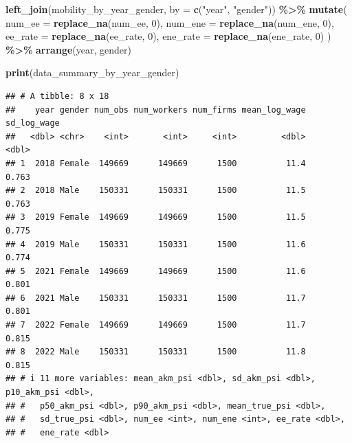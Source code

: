\documentclass[
]{article}
\newenvironment{Shaded}{\begin{snugshade}}{\end{snugshade}}
\newcommand{\AttributeTok}[1]{\textcolor[rgb]{0.13,0.29,0.53}{#1}}
\newcommand{\DecValTok}[1]{\textcolor[rgb]{0.00,0.00,0.81}{#1}}
\newcommand{\FunctionTok}[1]{\textcolor[rgb]{0.13,0.29,0.53}{\textbf{#1}}}
\newcommand{\NormalTok}[1]{#1}
\newcommand{\SpecialCharTok}[1]{\textcolor[rgb]{0.81,0.36,0.00}{\textbf{#1}}}
\newcommand{\StringTok}[1]{\textcolor[rgb]{0.31,0.60,0.02}{#1}}
\begin{document}
\begin{Shaded}
\begin{Highlighting}[]
    \FunctionTok{left\_join}\NormalTok{(mobility\_by\_year\_gender, }\AttributeTok{by =} \FunctionTok{c}\NormalTok{(}\StringTok{"year"}\NormalTok{, }\StringTok{"gender"}\NormalTok{)) }\SpecialCharTok{\%\textgreater{}\%}
    \FunctionTok{mutate}\NormalTok{(}
        \AttributeTok{num\_ee =} \FunctionTok{replace\_na}\NormalTok{(num\_ee, }\DecValTok{0}\NormalTok{),}
        \AttributeTok{num\_ene =} \FunctionTok{replace\_na}\NormalTok{(num\_ene, }\DecValTok{0}\NormalTok{),}
        \AttributeTok{ee\_rate =} \FunctionTok{replace\_na}\NormalTok{(ee\_rate, }\DecValTok{0}\NormalTok{),}
        \AttributeTok{ene\_rate =} \FunctionTok{replace\_na}\NormalTok{(ene\_rate, }\DecValTok{0}\NormalTok{)}
\NormalTok{    ) }\SpecialCharTok{\%\textgreater{}\%}
    \FunctionTok{arrange}\NormalTok{(year, gender)}

\FunctionTok{print}\NormalTok{(data\_summary\_by\_year\_gender)}
\end{Highlighting}
\end{Shaded}

\begin{verbatim}
## # A tibble: 8 x 18
##    year gender num_obs num_workers num_firms mean_log_wage sd_log_wage
##   <dbl> <chr>    <int>       <int>     <int>         <dbl>       <dbl>
## 1  2018 Female  149669      149669      1500          11.4       0.763
## 2  2018 Male    150331      150331      1500          11.5       0.763
## 3  2019 Female  149669      149669      1500          11.5       0.775
## 4  2019 Male    150331      150331      1500          11.6       0.774
## 5  2021 Female  149669      149669      1500          11.6       0.801
## 6  2021 Male    150331      150331      1500          11.7       0.801
## 7  2022 Female  149669      149669      1500          11.7       0.815
## 8  2022 Male    150331      150331      1500          11.8       0.815
## # i 11 more variables: mean_akm_psi <dbl>, sd_akm_psi <dbl>, p10_akm_psi <dbl>,
## #   p50_akm_psi <dbl>, p90_akm_psi <dbl>, mean_true_psi <dbl>,
## #   sd_true_psi <dbl>, num_ee <int>, num_ene <int>, ee_rate <dbl>,
## #   ene_rate <dbl>
\end{verbatim}
\end{document}

